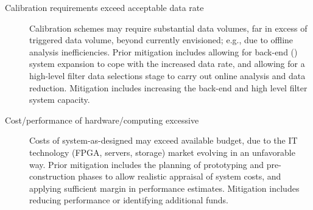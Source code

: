 \begin{description}
\item[Calibration requirements exceed acceptable data rate]
  Calibration schemes may require substantial data 
volumes, far in excess of triggered data volume, beyond currently
envisioned; e.g., due to offline analysis inefficiencies. Prior
mitigation includes allowing for back-end () system expansion to cope
with the increased data rate, and allowing for a high-level filter data
selections stage to carry out online analysis and data
reduction. Mitigation includes increasing the back-end  and high
level filter system capacity. 

\item[Cost/performance of hardware/computing excessive] Costs of
  system-as-designed may exceed available budget, due to the IT technology (FPGA, servers, storage) market evolving in an unfavorable way. Prior mitigation
  includes the planning of prototyping and pre-construction phases to allow
  realistic appraisal of system costs, and applying sufficient margin
  in performance estimates.  Mitigation includes reducing performance
  or identifying additional funds. 





\end{description}
